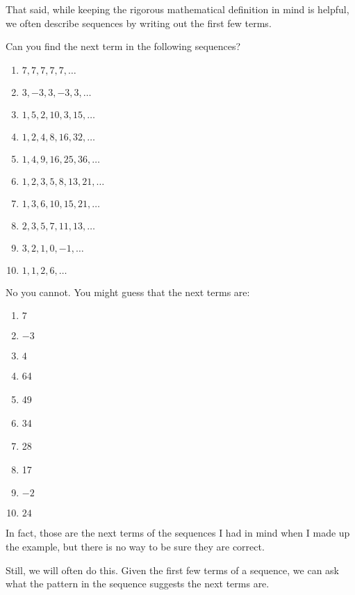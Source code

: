 \documentclass[11pt,]{book}
\theoremstyle{ptxplainnotitle}
\theoremstyle{ptxplaintitle}
\theoremstyle{ptxdefinitionnotitle}
\theoremstyle{ptxdefinitiontitle}
\theoremstyle{ptxdefinitionnotitle}
\theoremstyle{ptxdefinitiontitle}
\theoremstyle{ptxdefinitionnotitle}
\theoremstyle{ptxdefinitiontitle}
\theoremstyle{ptxdefinitiontitlenonumber}
\theoremstyle{ptxdefinitiontitlenonumber}
\numberwithin{equation}{chapter}
\begin{document}
\par
\hypertarget{p-27}{}%
That said, while keeping the rigorous mathematical definition in mind is helpful, we often describe sequences by writing out the first few terms.%
\begin{example}\label{example-1}
\hypertarget{p-28}{}%
Can you find the next term in the following sequences?%
\par
\hypertarget{p-29}{}%
\leavevmode%
\begin{enumerate}
\item\hypertarget{li-4}{}\(7,7,7,7,7, \ldots\)%
\item\hypertarget{li-5}{}\(3, -3, 3, -3, 3, \ldots\)%
\item\hypertarget{li-6}{}\(1, 5, 2, 10, 3, 15, \ldots\)%
\item\hypertarget{li-7}{}\(1, 2, 4, 8, 16, 32, \ldots\)%
\item\hypertarget{li-8}{}\(1, 4, 9, 16, 25, 36, \ldots\)%
\item\hypertarget{li-9}{}\(1, 2, 3, 5, 8, 13, 21, \ldots\)%
\item\hypertarget{li-10}{}\(1, 3, 6, 10, 15, 21, \ldots\)%
\item\hypertarget{li-11}{}\(2, 3, 5, 7, 11, 13, \ldots\)%
\item\hypertarget{li-12}{}\(3, 2, 1, 0, -1, \ldots\)%
\item\hypertarget{li-13}{}\(1, 1, 2, 6, \ldots\)%
\end{enumerate}
%
\par\smallskip%
\noindent\textbf{}\hypertarget{solution-1}{}\hypertarget{p-30}{}%
No you cannot. You might guess that the next terms are:%
\par
\hypertarget{p-31}{}%
\leavevmode%
\begin{enumerate}
\item\hypertarget{li-14}{}\(7\)%
\item\hypertarget{li-15}{}\(-3\)%
\item\hypertarget{li-16}{}\(4\)%
\item\hypertarget{li-17}{}\hypertarget{p-32}{}%
64%
\item\hypertarget{li-18}{}\hypertarget{p-33}{}%
49%
\item\hypertarget{li-19}{}\hypertarget{p-34}{}%
34%
\item\hypertarget{li-20}{}\hypertarget{p-35}{}%
28%
\item\hypertarget{li-21}{}\hypertarget{p-36}{}%
17%
\item\hypertarget{li-22}{}\(-2\)%
\item\hypertarget{li-23}{}\(24\)%
\end{enumerate}
%
\par
\hypertarget{p-37}{}%
In fact, those are the next terms of the sequences I had in mind when I made up the example, but there is no way to be sure they are correct.%
\par
\hypertarget{p-38}{}%
Still, we will often do this. Given the first few terms of a sequence, we can ask what the pattern in the sequence suggests the next terms are.%
\end{example}
\end{document}
